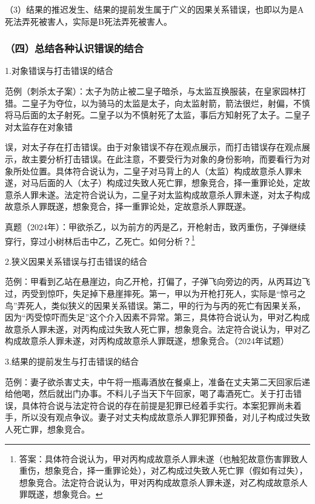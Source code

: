 （3）结果的推迟发生、结果的提前发生属于广义的因果关系错误，也即以为是A死法弄死被害人，实际是B死法弄死被害人。

\subsubsection*{（四）总结各种认识错误的结合}

1.对象错误与打击错误的结合

范例（刺杀太子案）：太子为防止被二皇子暗杀，与太监互换服装，在皇家园林打猎。二皇子为夺位，以为骑马的太监是太子，向太监射箭，箭法很烂，射偏，不慎将马后面的太子射死。二皇子以为不慎射死了太监，事后方知射死了太子。二皇子对太监存在对象错

误，对太子存在打击错误。由于对象错误不存在观点展示，而打击错误存在观点展示，故主要分析打击错误。在此注意，不要受行为对象的身份影响，而要看行为对象所处位置。具体符合说认为，二皇子对马背上的人（太监）构成故意杀人罪未遂，对马后面的人（太子）构成过失致人死亡罪，想象竞合，择一重罪论处，定故意杀人罪未遂。法定符合说认为，二皇子对太监构成故意杀人罪未遂，对太子构成故意杀人罪既遂，想象竞合，择一重罪论处，定故意杀人罪既遂。

真题（2024年）：甲欲杀乙，以为前方的丙是乙，开枪射击，致丙重伤，子弹继续穿行，穿过小树林后击中乙，乙死亡。如何分析？\footnote{答案：具体符合说认为，甲对丙构成故意杀人罪未遂（也触犯故意伤害罪致人重伤，想象竞合，择一重罪论处），对乙构成过失致人死亡罪（假如有过失），想象竞合。法定符合说认为，甲对丙构成故意杀人罪未遂，对乙构成故意杀人罪既遂，想象竞合。}

2.狭义因果关系错误与打击错误的结合

范例：甲看到乙站在悬崖边，向乙开枪，打偏了，子弹飞向旁边的丙，从丙耳边飞过，丙受到惊吓，失足掉下悬崖摔死。第一，甲以为开枪打死人，实际是“惊弓之鸟”弄死人，类似狭义的因果关系错误。第二，甲的行为与丙的死亡有因果关系，因为“丙受惊吓而失足”这个介入因素不异常。第三，具体符合说认为，甲对乙构成故意杀人罪未遂，对丙构成过失致人死亡罪，想象竞合。法定符合说认为，甲对乙构成故意杀人罪未遂，对丙构成故意杀人罪既遂，想象竞合。（2024年试题）

3.结果的提前发生与打击错误的结合

范例：妻子欲杀害丈夫，中午将一瓶毒酒放在餐桌上，准备在丈夫第二天回家后递给他喝，然后就出门办事。不料儿子当天下午回家，喝了毒酒死亡。关于打击错误，具体符合说与法定符合说的存在前提是犯罪已经着手实行。本案犯罪尚未着手，所以没有观点争议。妻子对丈夫构成故意杀人罪犯罪预备，对儿子构成过失致人死亡罪，想象竞合。

